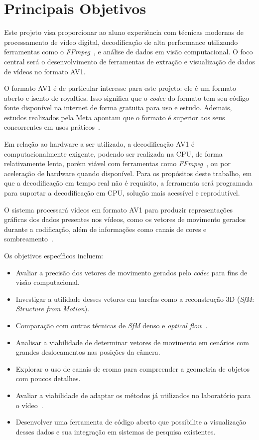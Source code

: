 \documentclass[a4paper,titlepage]{article}
\begin{document}
\section{Principais Objetivos}

Este projeto visa proporcionar ao aluno experiência com técnicas modernas de processamento de vídeo digital, decodificação de alta performance utilizando ferramentas como o \emph{FFmpeg}~\cite{ffmpeg}, e análise de dados em visão computacional. O foco central será o desenvolvimento de ferramentas de extração e visualização de dados de vídeos no formato AV1.

O formato AV1 é de particular interesse para este projeto: ele é um formato aberto e isento de royalties. Isso significa que o \emph{codec} do formato tem seu código fonte disponível na internet de forma gratuita para uso e estudo. Ademais, estudos realizados pela Meta apontam que o formato é superior aos seus concorrentes em usos práticos~\cite{metastudy}.

Em relação ao hardware a ser utilizado, a decodificação AV1 é computacionalmente exigente, podendo ser realizada na CPU, de forma relativamente lenta, porém viável com ferramentas como \emph{FFmpeg}~\cite{ffmpeg}, ou por aceleração de hardware quando disponível. Para os propósitos deste trabalho, em que a decodificação em tempo real não é requisito, a ferramenta será programada para suportar a decodificação em CPU, solução mais acessível e reprodutível.

O sistema processará vídeos em formato AV1 para produzir representações gráficas dos dados presentes nos vídeos, como os vetores de movimento gerados durante a codificação, além de informações como canais de cores e sombreamento~\cite{aomedia2021av1}.

Os objetivos específicos incluem:
\begin{itemize}
    \item Avaliar a precisão dos vetores de movimento gerados pelo \emph{codec} para fins de visão computacional.
    \item Investigar a utilidade desses vetores em tarefas como a reconstrução 3D (\emph{SfM}: \emph{Structure from Motion}).
    \item Comparação com outras técnicas de \emph{SfM} denso e \emph{optical flow}~\cite{av1motion}.
    \item Analisar a viabilidade de determinar vetores de movimento em cenários com grandes deslocamentos nas posições da câmera.
    \item Explorar o uso de canais de croma para compreender a geometria de objetos com poucos detalhes.
    \item Avaliar a viabilidade de adaptar os métodos já utilizados no laboratório para o vídeo~\cite{trifocal_problem}.
    \item Desenvolver uma ferramenta de código aberto que possibilite a visualização desses dados e sua integração em sistemas de pesquisa existentes.
\end{itemize}
\end{document}
